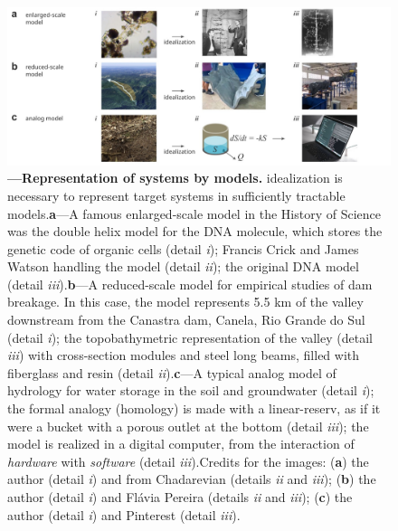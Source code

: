 \documentclass[./main_en.tex]{subfiles}
\begin{document}
\begin{figure}[t!] %
	\centering				
	\includegraphics[width=0.95\linewidth]{figs/fig_representation_en.jpg}		
	\caption[Representation of systems by models]
	{\textbf{---\;Representation of systems by models.}
        \gls{idealization} is necessary to represent target systems in sufficiently tractable models.\;\textbf{a}\;---\;A famous enlarged-scale \gls{model} in the History of Science was the double helix \gls{model} for the DNA molecule, which stores the genetic code of organic cells (detail \textrm{\textit{i}}); Francis Crick and James Watson handling the \gls{model} (detail \textrm{\textit{ii}}); the original DNA \gls{model} (detail \textrm{\textit{iii}}).\;\textbf{b}\;---\;A reduced-scale \gls{model} for empirical studies of dam breakage. In this case, the \gls{model} represents 5.5 km of the valley downstream from the Canastra dam, Canela, Rio Grande do Sul (detail \textrm{\textit{i}}); the topobathymetric representation of the valley (detail \textrm{\textit{iii}}) with cross-section modules and steel long beams, filled with fiberglass and resin (detail \textrm{\textit{ii}}).\;\textbf{c}\;---\;A typical analog \gls{model} of \gls{hydrology} for water storage in the soil and groundwater (detail \textrm{\textit{i}}); the formal \gls{analogy} (homology) is made with a \gls{linear-reserv}, as if it were a bucket with a porous outlet at the bottom (detail \textrm{\textit{iii}}); the \gls{model} is realized in a digital computer, from the interaction of \textit{hardware} with \textit{software} (detail \textrm{\textit{iii}}).\;Credits for the images: (\textbf{a}) the author (detail \textrm{\textit{i}}) and from Chadarevian \cite{deChadarevian2003} (details \textrm{\textit{ii}} and \textrm{\textit{iii}}); (\textbf{b}) the author (detail \textrm{\textit{i}}) and Flávia Pereira \cite{Pereira2023} (details \textrm{\textit{ii}} and \textrm{\textit{iii}}); (\textbf{c}) the author (detail \textrm{\textit{i}}) and Pinterest (detail \textrm{\textit{iii}}).
	}
\label{fig:sys:represen}  %
\end{figure}
\end{document}
